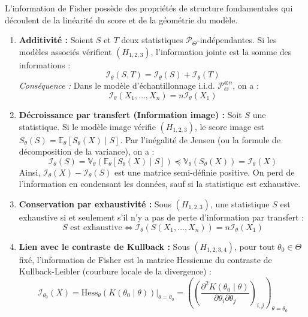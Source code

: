 L'information de Fisher possède des propriétés de structure fondamentales qui découlent de la linéarité du score et de la 
géométrie du modèle.

\begin{enumerate}
    \item \textbf{Additivité :} 
    Soient $S$ et $T$ deux statistiques $\mathcal{P}_\Theta$-indépendantes. Si les modèles associés vérifient $(H_{1,2,3})$, l'information jointe est la somme des informations :
    $$ \mathcal{I}_\theta(S, T) = \mathcal{I}_\theta(S) + \mathcal{I}_\theta(T) $$
    \textit{Conséquence :} Dans le modèle d'échantillonnage i.i.d. $\mathcal{P}_\Theta^{\otimes n}$, on a :
    $$ \boxed{\mathcal{I}_\theta(X_1, \dots, X_n) = n \mathcal{I}_\theta(X_1)} $$

    \item \textbf{Décroissance par transfert (Information image) :} 
    Soit $S$ une statistique. Si le modèle image vérifie $(H_{1,2,3})$, le score image est $S_\theta(S) = \mathbb{E}_\theta[S_\theta(X) \mid S]$. Par l'inégalité de Jensen (ou la formule de décomposition de la variance), on a :
    $$ \mathcal{I}_\theta(S) = \mathbb{V}_\theta(\mathbb{E}_\theta[S_\theta(X) \mid S]) \preceq \mathbb{V}_\theta(S_\theta(X)) = \mathcal{I}_\theta(X) $$
    Ainsi, $\mathcal{I}_\theta(X) - \mathcal{I}_\theta(S)$ est une matrice semi-définie positive. On perd de l'information en condensant les données, sauf si la statistique est exhaustive.

    \item \textbf{Conservation par exhaustivité :} 
    Sous $(H_{1,2,3})$, une statistique $S$ est exhaustive si et seulement s'il n'y a pas de perte d'information par transfert :
    $$ \boxed{S \text{ est exhaustive} \iff \mathcal{I}_\theta(S(X_1, \dots, X_n)) = n \mathcal{I}_\theta(X_1)} $$

    \item \textbf{Lien avec le contraste de Kullback :} 
    Sous $(H_{1,2,3,4})$, pour tout $\theta_0 \in \Theta$ fixé, l'information de Fisher est la matrice Hessienne du contraste de Kullback-Leibler (courbure locale de la divergence) :
    $$ \mathcal{I}_{\theta_0}(X) = \text{Hess}_{\theta} \left( K(\theta_0 \mid \theta) \right) \Big|_{\theta=\theta_0} = \left( \left( \frac{\partial^2 K(\theta_0 \mid \theta)}{\partial \theta_i \partial \theta_j} \right)_{i,j} \right)_{\theta=\theta_0} $$
\end{enumerate}